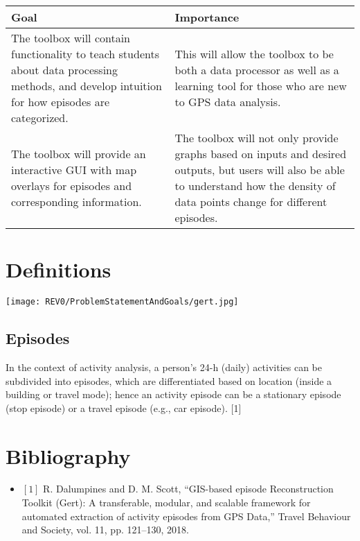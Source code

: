 \documentclass{article}
\begin{document}
\begin{tabular}{|p{6cm}|p{6cm}|}
    		\hline
    		\textbf{Goal} & \textbf{Importance} \\
    		\hline
    		The toolbox will contain functionality to teach students about data processing methods, and develop intuition for how episodes are categorized. & This will allow the toolbox to be both a data processor as well as a learning tool for those who are new to GPS data analysis.  \\
    		\hline
    		The toolbox will provide an interactive GUI with map overlays for episodes and corresponding information. & The toolbox will not only provide graphs based on inputs and desired outputs, but users will also be able to understand how the density of data points change for different episodes.  \\
    		\hline
\end{tabular}
\section{Definitions}
\texttt{[image: REV0/ProblemStatementAndGoals/gert.jpg]}
\subsection{Episodes}
In the context of activity analysis, a person’s 24-h (daily) activities can be subdivided into episodes, which are differentiated
based on location (inside a building or travel mode); hence an
activity episode can be a stationary episode (stop episode) or a travel episode (e.g., car episode). [1]

\section{Bibliography}
\begin{itemize}
    \item $[1]$ R. Dalumpines and D. M. Scott, “GIS-based episode Reconstruction Toolkit (Gert): A transferable, modular, and scalable framework for automated extraction of activity episodes from GPS Data,” Travel Behaviour and Society, vol. 11, pp. 121–130, 2018. 
\end{itemize}
 
\end{document}
